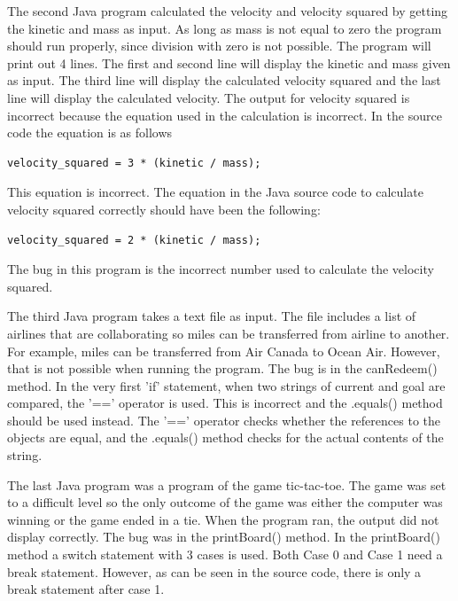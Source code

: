 The second Java program calculated the velocity and velocity squared by getting the kinetic and mass as input. As long as mass is not equal to zero the program should run properly, since division with zero is not possible. The program will print out 4 lines. The first and second line will display the kinetic and mass given as input. The third line will display the calculated velocity squared and the last line will display the calculated velocity. The output for velocity squared is incorrect because the equation used in the calculation is incorrect. In the source code the equation is as follows
\begin{lstlisting}
velocity_squared = 3 * (kinetic / mass);
\end{lstlisting}
This equation is incorrect. The equation in the Java source code to calculate velocity squared correctly should have been the following:
\begin{lstlisting}
velocity_squared = 2 * (kinetic / mass);
\end{lstlisting}
The bug in this program is the incorrect number used to calculate the velocity squared.
 
 
 The third Java program takes a text file as input. The file includes a list of airlines that are collaborating so miles can be transferred from airline to another. For example, miles can be  transferred from Air Canada to Ocean Air. However, that is not possible when running the program. The bug is in the canRedeem() method. In the very first 'if' statement, when two strings of current and goal are compared, the '==' operator is used. This is incorrect and the .equals() method should be used instead. The '==' operator checks whether the references to the objects are equal, and the .equals() method checks for the actual contents of the string.
 
 The last Java program was a program of the game  tic-tac-toe. The game was set to a difficult level so the only outcome of the game was either the computer was winning or the game ended in a tie. When the program ran, the output did not display correctly. The bug was in the printBoard() method. In the printBoard() method  a switch statement with 3 cases is used. Both Case 0 and Case 1 need a break statement. However, as can be seen in the source code, there is only a break statement after case 1.